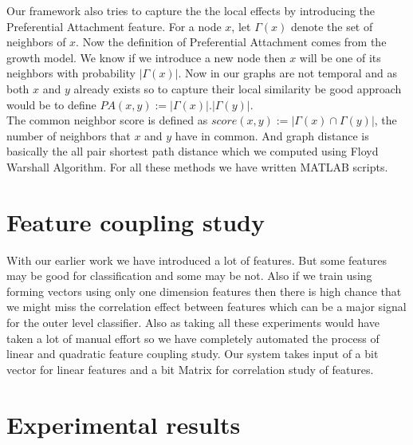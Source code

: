 Our framework also tries to capture the the local effects by introducing the Preferential Attachment feature. For a node $x$, let $\Gamma (x)$ denote the set of neighbors of $x$. Now the definition of Preferential Attachment comes from the growth model. We know if we introduce a new node then $x$ will be one of its neighbors with probability $|\Gamma(x)|$. Now in our graphs are not temporal and as both $x$ and $y$ already exists so to capture their local similarity be good approach would be to define $PA(x,y) := |\Gamma(x)|.|\Gamma(y)|$.
\\
The common neighbor score is defined as $score(x, y) := |\Gamma(x) \cap \Gamma(y)|$, the number of neighbors that $x$ and $y$ have in common. And graph distance is basically the all pair shortest path distance which we computed using Floyd Warshall Algorithm. For all these methods we have written MATLAB scripts.

\section*{Feature coupling study}
With our earlier work we have introduced a lot of features. But some features may be good for classification and some may be not. Also if we train using forming vectors using only one dimension features then there is high chance that we might miss the correlation effect between features which can be a major signal for the outer level classifier. Also as taking all these experiments would have taken a lot of manual effort so we have completely automated the process of linear and quadratic feature coupling study. Our system takes input of a bit vector for linear features and a bit Matrix for correlation study of features.

\section*{Experimental results}

